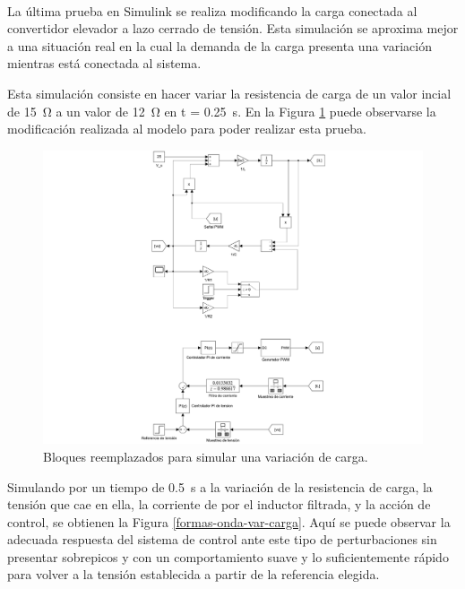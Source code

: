 La última prueba en Simulink\textsuperscript\textregistered \hspace{0.6pt} se realiza modificando la carga conectada al convertidor elevador a lazo cerrado de tensión. Esta simulación se aproxima mejor a una situación real en la cual la demanda de la carga presenta una variación mientras está conectada al sistema.

Esta simulación consiste en hacer variar la resistencia de carga de un valor incial de \SI{15}{\ohm} a un valor de \SI{12}{\ohm} en t = \SI{0.25}{\second}. En la Figura \ref{var-carga-simulink} puede observarse la modificación realizada al modelo para poder realizar esta prueba.

\begin{figure}[hbt!]
  \centering
  \includegraphics[width=0.35\columnwidth]{Imágenes/Diseño del control/Variación de parámetros de carga/Variación de resistencia de carga/Estructura en Simulink.pdf}
  \caption{Bloques reemplazados para simular una variación de carga.}
  \label{var-carga-simulink}
\end{figure} 

Simulando por un tiempo de \SI{0.5}{\second} a la variación de la resistencia de carga, la tensión que cae en ella, la corriente de por el inductor filtrada, y la acción de control, se obtienen la Figura \ref{formas-onda-var-carga}. Aquí se puede observar la adecuada respuesta del sistema de control ante este tipo de perturbaciones sin presentar sobrepicos y con un comportamiento suave y lo suficientemente rápido para volver a la tensión establecida a partir de la referencia elegida.

